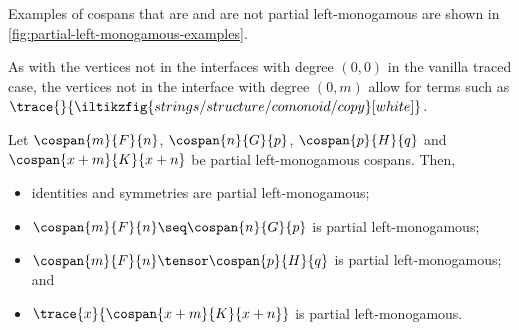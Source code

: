 \begin{example}
    Examples of cospans that are and are not partial left-monogamous are shown
    in \cref{fig:partial-left-monogamous-examples}.
\end{example}

\begin{remark}
    As with the vertices not in the interfaces with degree \((0, 0)\) in the
    vanilla traced case, the vertices not in the interface with degree
    \((0, m)\) allow for terms such as \(
        \trace{}{\iltikzfig{strings/structure/comonoid/copy}[white]}
    \).
\end{remark}

\begin{lemma}
    \label{lem:partial-monogamous-ops}
    Let \(\cospan{m}{F}{n}\), \(\cospan{n}{G}{p}\), \(\cospan{p}{H}{q}\) and
    \(\cospan{x+m}{K}{x+n}\) be partial left-monogamous cospans.
    Then,
    \begin{itemize}
        \item identities and symmetries are partial left-monogamous;
        \item \(\cospan{m}{F}{n} \seq \cospan{n}{G}{p}\) is partial
                left-monogamous;
        \item \(\cospan{m}{F}{n} \tensor \cospan{p}{H}{q}\) is partial
                left-monogamous; and
        \item \(\trace{x}{\cospan{x+m}{K}{x+n}}\) is partial left-monogamous.
    \end{itemize}
\end{lemma}
